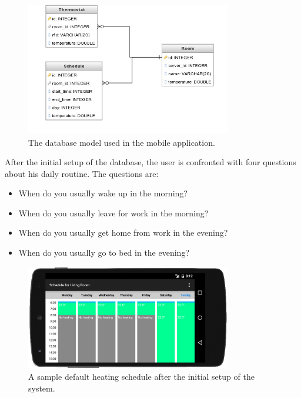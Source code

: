 \begin{figure}
	\begin{center}
		\includegraphics[width=0.8\textwidth]{images/mobile_database.jpeg}
	\end{center}
	\caption{The database model used in the mobile application.}
	\label{fig:db_model}
\end{figure}

After the initial setup of the database, the user is confronted with four questions about his daily routine. The questions are:

\begin{itemize}
\item{When do you usually wake up in the morning?}
\item{When do you usually leave for work in the morning?}
\item{When do you usually get home from work in the evening?}
\item{When do you usually go to bed in the evening?}
\end{itemize}

\begin{figure}
	\begin{center}
		\includegraphics[width=0.8\textwidth]{images/default_heating_schedule.png}
	\end{center}
	\caption{A sample default heating schedule after the initial setup of the system.}
	\label{fig:default_schedulel}
\end{figure}


